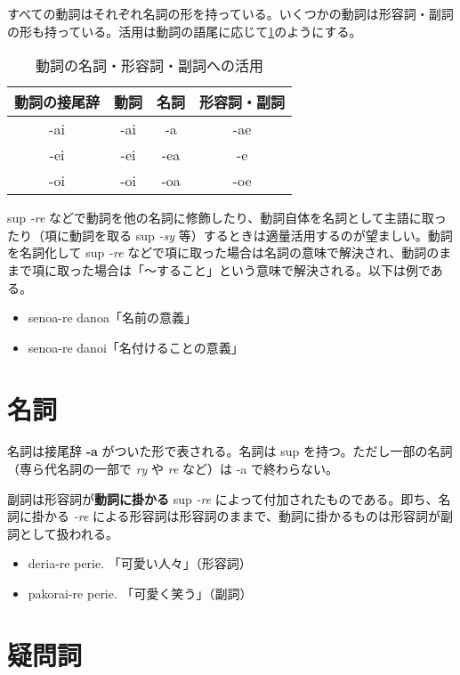 すべての動詞はそれぞれ名詞の形を持っている。いくつかの動詞は形容詞・副詞の形も持っている。活用は動詞の語尾に応じて\cref{table:conjugation-of-verb}のようにする。

\begin{table}[h]
    \centering
    \caption{動詞の名詞・形容詞・副詞への活用}
    \label{table:conjugation-of-verb}
    \begin{tabular}{cccc}
        \hline
        動詞の接尾辞 & 動詞 & 名詞 & 形容詞・副詞 \\
        \hline \hline
        -ai & -ai & -a  & -ae \\
        -ei & -ei & -ea & -e  \\
        -oi & -oi & -oa & -oe \\
        \hline
    \end{tabular}
\end{table}

sup \emph{-re} などで動詞を他の名詞に修飾したり、動詞自体を名詞として主語に取ったり（項に動詞を取る sup \emph{-sy} 等）するときは適量活用するのが望ましい。動詞を名詞化して sup \emph{-re} などで項に取った場合は名詞の意味で解決され、動詞のままで項に取った場合は「～すること」という意味で解決される。以下は例である。

\begin{itemize}
    \item senoa-re danoa「名前の意義」
    \item senoa-re danoi「名付けることの意義」
\end{itemize}

\section{名詞}

名詞は接尾辞 \textbf{-a} がついた形で表される。名詞は sup を持つ。ただし一部の名詞（専ら代名詞の一部で \emph{ry} や \emph{re} など）は -a で終わらない。

副詞は形容詞が\textbf{動詞に掛かる} sup \emph{-re} によって付加されたものである。即ち、名詞に掛かる \emph{-re} による形容詞は形容詞のままで、動詞に掛かるものは形容詞が副詞として扱われる。

\begin{itemize}
    \item deria-re perie. 「可愛い人々」（形容詞）
    \item pakorai-re perie. 「可愛く笑う」（副詞）
\end{itemize}

\section{疑問詞}


